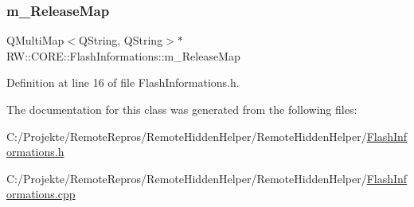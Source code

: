 \subsubsection{\texorpdfstring{m\+\_\+\+Release\+Map}{m\_ReleaseMap}}
{\footnotesize\ttfamily Q\+Multi\+Map$<$Q\+String, Q\+String$>$$\ast$ R\+W\+::\+C\+O\+R\+E\+::\+Flash\+Informations\+::m\+\_\+\+Release\+Map\hspace{0.3cm}{\ttfamily [private]}}



Definition at line 16 of file Flash\+Informations.\+h.



The documentation for this class was generated from the following files\+:\begin{DoxyCompactItemize}
\item 
C\+:/\+Projekte/\+Remote\+Repros/\+Remote\+Hidden\+Helper/\+Remote\+Hidden\+Helper/\hyperlink{_flash_informations_8h}{Flash\+Informations.\+h}\item 
C\+:/\+Projekte/\+Remote\+Repros/\+Remote\+Hidden\+Helper/\+Remote\+Hidden\+Helper/\hyperlink{_flash_informations_8cpp}{Flash\+Informations.\+cpp}\end{DoxyCompactItemize}
